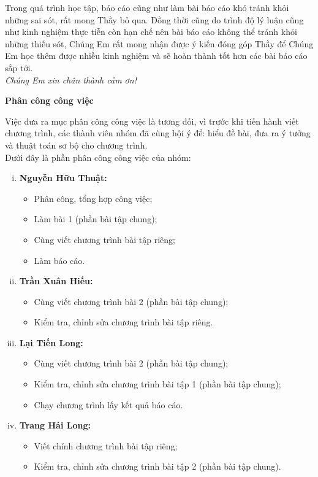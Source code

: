 \documentclass[12pt,a4paper]{article}
\begin{document}
Trong quá trình học tập, báo cáo cũng như làm bài báo cáo khó tránh khỏi những sai sót, rất mong Thầy bỏ qua. Đồng thời cũng do trình độ lý luận cũng như kinh nghiệm thực tiễn còn hạn chế nên bài báo cáo không thể tránh khỏi những thiếu sót, Chúng Em rất mong nhận được ý kiến đóng góp Thầy để Chúng Em học thêm được  nhiều kinh nghiệm và sẽ hoàn thành tốt hơn các bài báo cáo sắp tới.\\

\textit{Chúng Em xin chân thành cảm ơn!}
\newpage
\begin{center}
\textbf{\textbf{\Large Phân công công việc}}\\
\end{center}	
Việc đưa ra mục phân công công việc là tương đối, vì trước khi tiến hành viết chương trình, các thành viên nhóm đã cùng hội ý để: hiểu đề bài, đưa ra ý tưởng và thuật toán sơ bộ cho chương trình.\\
Dưới đây là phần phân công công việc của nhóm:


\begin{enumerate}[i)]
	\item \textbf{Nguyễn Hữu Thuật:}
	\begin{itemize}
		\item Phân công, tổng hợp công việc;
		\item Làm bài 1 (phần bài tập chung);
		\item Cùng viết chương trình bài tập riêng;
		\item Làm báo cáo.
	\end{itemize}
	\item \textbf{Trần Xuân Hiếu:}
	\begin{itemize}
		\item Cùng viết chương trình bài 2 (phần bài tập chung);
		\item Kiểm tra, chỉnh sửa chương trình bài tập riêng.
	\end{itemize}
	\item \textbf{Lại Tiến Long:}
	\begin{itemize}
		\item Cùng viết chương trình bài 2 (phần bài tập chung);
		\item Kiểm tra, chỉnh sửa chương trình bài tập 1 (phần bài tập chung);
		\item Chạy chương trình lấy kết quả báo cáo.
	\end{itemize}
	\item \textbf{Trang Hải Long:}
	\begin{itemize}
		\item Viết chính chương trình bài tập riêng;
		\item Kiểm tra, chỉnh sửa chương trình bài tập 2 (phần bài tập chung).
	\end{itemize}

\end{enumerate}
\end{document}
